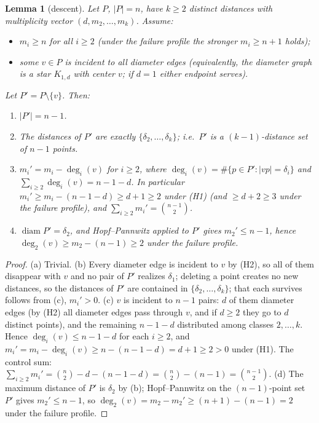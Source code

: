 \documentclass[11pt]{article}
\newtheorem{lemma}[theorem]{Lemma}
\theoremstyle{definition}
\theoremstyle{remark}
\DeclareMathOperator{\diam}{diam}
\begin{document}
\begin{lemma}[descent]\label{lem:descent}
Let $P$, $|P| = n$, have $k \ge 2$ distinct distances with multiplicity vector
$(d, m_2, \dots, m_k)$. Assume:
\begin{itemize}
\item[\emph{(H1)}] $m_i \ge n$ for all $i \ge 2$ (under the failure profile the stronger
$m_i \ge n+1$ holds);
\item[\emph{(H2)}] some $v \in P$ is incident to \emph{all} diameter edges (equivalently,
the diameter graph is a star $K_{1,d}$ with center $v$; if $d = 1$ either endpoint
serves).
\end{itemize}
Let $P' = P \setminus \{v\}$. Then:
\begin{enumerate}
\item[(a)] $|P'| = n - 1$.
\item[(b)] The distances of $P'$ are \emph{exactly} $\{\delta_2, \dots, \delta_k\}$;
i.e.\ $P'$ is a $(k-1)$-distance set of $n-1$ points.
\item[(c)] $m_i' = m_i - \deg_i(v)$ for $i \ge 2$, where
$\deg_i(v) = \#\{p \in P' : |vp| = \delta_i\}$ and
$\sum_{i \ge 2} \deg_i(v) = n - 1 - d$. In particular
$m_i' \ge m_i - (n-1-d) \ge d + 1 \ge 2$ under (H1) (and $\ge d + 2 \ge 3$ under the
failure profile), and $\sum_{i \ge 2} m_i' = \binom{n-1}{2}$.
\item[(d)] $\diam P' = \delta_2$, and Hopf--Pannwitz applied to $P'$ gives
$m_2' \le n - 1$, hence $\deg_2(v) \ge m_2 - (n-1) \ge 2$ under the failure profile.
\end{enumerate}
\end{lemma}

\begin{proof}
(a) Trivial. (b) Every diameter edge is incident to $v$ by (H2), so all of them disappear
with $v$ and no pair of $P'$ realizes $\delta_1$; deleting a point creates no new
distances, so the distances of $P'$ are contained in $\{\delta_2, \dots, \delta_k\}$; that
each survives follows from (c), $m_i' > 0$. (c) $v$ is incident to $n-1$ pairs: $d$ of
them diameter edges (by (H2) all diameter edges pass through $v$, and if $d \ge 2$ they go
to $d$ distinct points), and the remaining $n-1-d$ distributed among classes
$2, \dots, k$. Hence $\deg_i(v) \le n-1-d$ for each $i \ge 2$, and
$m_i' = m_i - \deg_i(v) \ge n - (n-1-d) = d+1 \ge 2 > 0$ under (H1). The control sum:
$\sum_{i \ge 2} m_i' = \binom{n}{2} - d - (n-1-d) = \binom{n}{2} - (n-1) =
\binom{n-1}{2}$. (d) The maximum distance of $P'$ is $\delta_2$ by (b); Hopf--Pannwitz on
the $(n-1)$-point set $P'$ gives $m_2' \le n-1$, so
$\deg_2(v) = m_2 - m_2' \ge (n+1) - (n-1) = 2$ under the failure profile.
\end{proof}
\end{document}
